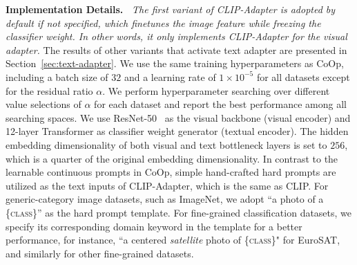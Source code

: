 \documentclass[default,iicol]{sn-jnl}%
\theoremstyle{thmstyleone}%
\theoremstyle{thmstyletwo}%
\theoremstyle{thmstylethree}%
\begin{document}
\vspace{3pt}
\noindent\textbf{Implementation Details.~} \textit{The first variant of CLIP-Adapter is adopted by default if not specified, which finetunes the image feature while freezing the classifier weight. In other words, it only implements CLIP-Adapter for the visual adapter.} The results of other variants that activate text adapter are presented in Section~\ref{sec:text-adapter}. We use the same training hyperparameters as CoOp, including a batch size of $32$ and a learning rate of  $1\times10^{-5}$ for all datasets except for the residual ratio
$\alpha$. We perform hyperparameter searching over different value selections of $\alpha$ for each dataset and report the best performance among all searching spaces. We use ResNet-50~\cite{he2016deep} as the visual backbone (visual encoder) and 12-layer Transformer as classifier weight generator (textual encoder). The hidden embedding dimensionality of both visual and text bottleneck layers is set to $256$, which is a quarter of the original embedding dimensionality. In contrast to the learnable continuous prompts in CoOp, simple hand-crafted hard prompts are utilized as the text inputs of CLIP-Adapter, which is the same as CLIP. For generic-category image datasets, such as ImageNet, we adopt ``a photo of a \{\textsc{class}\}'' as the hard prompt template. For fine-grained classification datasets, we specify its corresponding domain keyword in the template for a better performance, for instance, ``a centered \emph{satellite} photo of \{\textsc{class}\}" for EuroSAT, and similarly for other fine-grained datasets.
\end{document}
